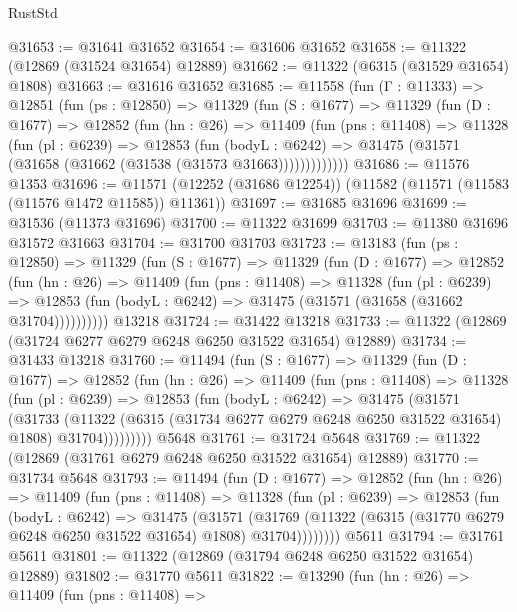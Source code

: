 \begin{lexlean}{RustStd}
\begin{coremodule}
@31653 := @31641 @31652
@31654 := @31606 @31652
@31658 := @11322 (@12869 (@31524 @31654) @12889)
@31662 := @11322 (@6315 (@31529 @31654) @1808)
@31663 := @31616 @31652
@31685 := @11558
    (fun (Γ : @11333) =>
    @12851
      (fun (ps : @12850) =>
      @11329
        (fun (S : @1677) =>
        @11329
          (fun (D : @1677) =>
          @12852
            (fun (hn : @26) =>
            @11409
              (fun (pns : @11408) =>
              @11328
                (fun (pl : @6239) =>
                @12853
                  (fun (bodyL : @6242) =>
                  @31475 (@31571 (@31658 (@31662 (@31538 (@31573 @31663)))))))))))))
@31686 := @11576 @1353
@31696 := @11571 (@12252 (@31686 @12254)) (@11582 (@11571 (@11583 (@11576 @1472 @11585)) @11361))
@31697 := @31685 @31696
@31699 := @31536 (@11373 @31696)
@31700 := @11322 @31699
@31703 := @11380 @31696 @31572 @31663
@31704 := @31700 @31703
@31723 := @13183
    (fun (ps : @12850) =>
    @11329
      (fun (S : @1677) =>
      @11329
        (fun (D : @1677) =>
        @12852
          (fun (hn : @26) =>
          @11409
            (fun (pns : @11408) =>
            @11328
              (fun (pl : @6239) =>
              @12853 (fun (bodyL : @6242) => @31475 (@31571 (@31658 (@31662 @31704))))))))))
    @13218
@31724 := @31422 @13218
@31733 := @11322 (@12869 (@31724 @6277 @6279 @6248 @6250 @31522 @31654) @12889)
@31734 := @31433 @13218
@31760 := @11494
    (fun (S : @1677) =>
    @11329
      (fun (D : @1677) =>
      @12852
        (fun (hn : @26) =>
        @11409
          (fun (pns : @11408) =>
          @11328
            (fun (pl : @6239) =>
            @12853
              (fun (bodyL : @6242) =>
              @31475
                (@31571
                  (@31733
                    (@11322
                      (@6315 (@31734 @6277 @6279 @6248 @6250 @31522 @31654) @1808)
                      @31704)))))))))
    @5648
@31761 := @31724 @5648
@31769 := @11322 (@12869 (@31761 @6279 @6248 @6250 @31522 @31654) @12889)
@31770 := @31734 @5648
@31793 := @11494
    (fun (D : @1677) =>
    @12852
      (fun (hn : @26) =>
      @11409
        (fun (pns : @11408) =>
        @11328
          (fun (pl : @6239) =>
          @12853
            (fun (bodyL : @6242) =>
            @31475
              (@31571
                (@31769
                  (@11322 (@6315 (@31770 @6279 @6248 @6250 @31522 @31654) @1808) @31704))))))))
    @5611
@31794 := @31761 @5611
@31801 := @11322 (@12869 (@31794 @6248 @6250 @31522 @31654) @12889)
@31802 := @31770 @5611
@31822 := @13290
    (fun (hn : @26) =>
    @11409
      (fun (pns : @11408) =>

\end{coremodule}
\end{lexlean}
